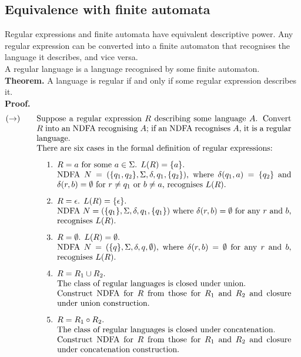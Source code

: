 \documentclass{article}
\begin{document}
\subsection{Equivalence with finite automata}
Regular expressions and finite automata have equivalent descriptive power. Any regular expression can be converted into a finite automaton that recognises the language it describes, and vice versa.\medskip
\\ A regular language is a language recognised by some finite automaton.\medskip
\\\textbf{Theorem.} A language is regular if and only if some regular expression describes it.\medskip
\\\textbf{Proof.}
\allowdisplaybreaks
\begin{align*}
(\rightarrow)\qquad&\parbox[t]{0.9\textwidth}{Suppose a regular expression $R$ describing some language $A$. Convert $R$ into an NDFA recognising $A$; if an NDFA recognises $A$, it is a regular language.
	\\ There are six cases in the formal definition of regular expressions:
	\begin{enumerate}
	\item $R = a$ for some $a \in \Sigma$. $L(R) = \{a\}$.
	\\ NDFA $N = (\{q_1, q_2\}, \Sigma, \delta, q_1, \{q_2\})$, where $\delta(q_1, a) = \{q_2\}$ and $\delta(r, b) = \emptyset$ for $r \neq q_1$ or $b \neq a$, recognises $L(R)$.
	\item $R = \epsilon$. $L(R) = \{\epsilon\}$.
	\\ NDFA $N = (\{q_1\}, \Sigma, \delta, q_1, \{q_1\})$ where $\delta(r, b) = \emptyset$ for any $r$ and $b$, recognises $L(R)$.
	\item $R = \emptyset$. $L(R) = \emptyset$.
	\\ NDFA $N = (\{q\}, \Sigma, \delta, q, \emptyset)$, where $\delta(r, b) = \emptyset$ for any $r$ and $b$, recognises $L(R)$.
	\item $R = R_1 \cup R_2$.
	\\ The class of regular languages is closed under union.
	\\ Construct NDFA for $R$ from those for $R_1$ and $R_2$ and closure under union construction.
	\item $R = R_1 \circ R_2$.
	\\ The class of regular languages is closed under concatenation.
	\\ Construct NDFA for $R$ from those for $R_1$ and $R_2$ and closure under concatenation construction.

\end{enumerate}}
\end{align*}
\end{document}
